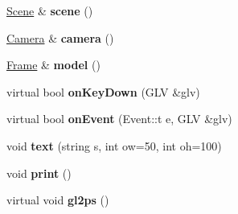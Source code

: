 \begin{DoxyCompactItemize}
\item 
\hypertarget{structvsr_1_1_g_l_v_app_a358a862cf454d3d5050d683106c0098d}{\hyperlink{classvsr_1_1_scene}{Scene} \& {\bfseries scene} ()}\label{structvsr_1_1_g_l_v_app_a358a862cf454d3d5050d683106c0098d}

\item 
\hypertarget{structvsr_1_1_g_l_v_app_aa29ad54deebbe9844bbab6a4e1c0a9be}{\hyperlink{classvsr_1_1_camera}{Camera} \& {\bfseries camera} ()}\label{structvsr_1_1_g_l_v_app_aa29ad54deebbe9844bbab6a4e1c0a9be}

\item 
\hypertarget{structvsr_1_1_g_l_v_app_a0bbe8b758f5b0da510bfaa72d468ec67}{\hyperlink{classvsr_1_1_frame}{Frame} \& {\bfseries model} ()}\label{structvsr_1_1_g_l_v_app_a0bbe8b758f5b0da510bfaa72d468ec67}

\item 
\hypertarget{structvsr_1_1_g_l_v_app_af8d5e3347401143c4a7bf75215555149}{virtual bool {\bfseries on\-Key\-Down} (G\-L\-V \&glv)}\label{structvsr_1_1_g_l_v_app_af8d5e3347401143c4a7bf75215555149}

\item 
\hypertarget{structvsr_1_1_g_l_v_app_a2ec3b9f8890687abdabf50da294a6200}{virtual bool {\bfseries on\-Event} (Event\-::t e, G\-L\-V \&glv)}\label{structvsr_1_1_g_l_v_app_a2ec3b9f8890687abdabf50da294a6200}

\item 
\hypertarget{structvsr_1_1_g_l_v_app_a92516b4f953a0b3bd94096c9c01903ab}{void {\bfseries text} (string s, int ow=50, int oh=100)}\label{structvsr_1_1_g_l_v_app_a92516b4f953a0b3bd94096c9c01903ab}

\item 
\hypertarget{structvsr_1_1_g_l_v_app_ae6ee78a5b211a4d679be31eb47f6f00a}{void {\bfseries print} ()}\label{structvsr_1_1_g_l_v_app_ae6ee78a5b211a4d679be31eb47f6f00a}

\item 
\hypertarget{structvsr_1_1_g_l_v_app_ae1c530ec896e50a143bcafe835e3f977}{virtual void {\bfseries gl2ps} ()}\label{structvsr_1_1_g_l_v_app_ae1c530ec896e50a143bcafe835e3f977}

\end{DoxyCompactItemize}
